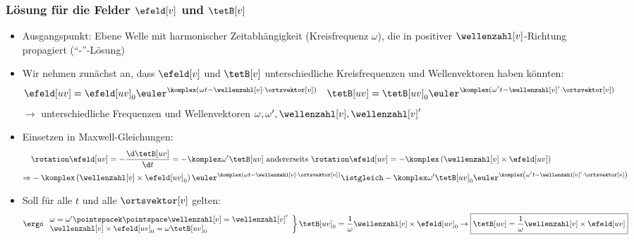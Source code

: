 \begin{frame}
  \frametitle{Lösung für die Felder \(\efeld[v]\) und \(\tetB[v]\)}
  \begin{itemize}[<+->]
  \item Ausgangspunkt: \alert{Ebene} Welle mit \alert{harmonischer} Zeitabhängigkeit (Kreisfrequenz \(\omega\)), die in \alert{positiver} \(\wellenzahl[v]\)-Richtung propagiert (\enquote{-}-Lösung)
  \item Wir nehmen zunächst an, dass \(\efeld[v]\) und \(\tetB[v]\) unterschiedliche Kreisfrequenzen und Wellenvektoren haben könnten:
\begin{align*}
\efeld[uv] &= \efeld[uv]_0 \euler^{\komplex(\omega t - \wellenzahl[v]\cdot\ortsvektor[v])}& \tetB[uv] &= \tetB[uv]_0 \euler^{\komplex(\omega ' t - \wellenzahl[v] \ensuremath{'}\cdot\ortsvektor[v])}
\end{align*}
\(\rightarrow\) unterschiedliche Frequenzen und Wellenvektoren \(\omega, \omega', \wellenzahl[v],\wellenzahl[v]'\)
\item Einsetzen in Maxwell-Gleichungen:
\begin{align*}
&\rotation \efeld[uv] = -\frac{\d \tetB[uv]}{\d t}= -\komplex \omega ' \tetB[uv] \text{ andererseits } \rotation \efeld[uv] = -\komplex\left( \wellenzahl[v] \times \efeld[uv]\right)\\
\Rightarrow & -\komplex\left( \wellenzahl[v] \times \efeld[uv]_0 \right) \euler^{\komplex\left(\omega t - \wellenzahl[v]\cdot\ortsvektor[v]\right)} \istgleich -\komplex \omega' \tetB[uv]_0 \euler^{\komplex \left(\omega' t -\wellenzahl[v]'\cdot\ortsvektor[v]\right)}
\end{align*}
\item Soll für alle \(t\) und alle \(\ortsvektor[v]\) gelten:
\begin{align*}
  \ergo & \left. \begin{array}{l}
\omega = \omega'\pointspacek \pointspace \wellenzahl[v] = \wellenzahl[v]'\\
\wellenzahl[v]\times\efeld[uv]_0 = \omega\tetB[uv]_0
                 \end{array}
\right\rbrace \tetB[uv]_0 = \frac{1}{\omega} \wellenzahl[v] \times\efeld[uv]_0 \to \boxed{\tetB[uv] = \frac{1}{\omega} \wellenzahl[v] \times\efeld[uv]}\\
\end{align*}
  \end{itemize}
\end{frame}


